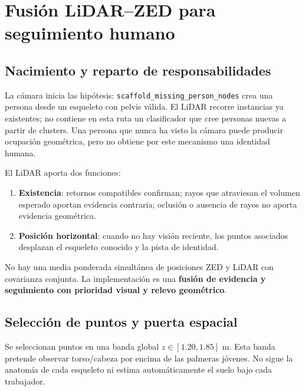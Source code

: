 \documentclass[11pt,a4paper]{article}
\newcommand{\code}[1]{\nolinkurl{#1}}
\begin{document}
\section{Fusión LiDAR--ZED para seguimiento humano}
\label{sec:humanfusion}

\subsection{Nacimiento y reparto de responsabilidades}
La cámara inicia las hipótesis: \code{scaffold_missing_person_nodes} crea una persona
desde un esqueleto con pelvis válida. El LiDAR recorre instancias ya existentes;
no contiene en esta ruta un clasificador que cree personas nuevas a partir de
clusters. Una persona que nunca ha visto la cámara puede producir ocupación
geométrica, pero no obtiene por este mecanismo una identidad humana.~\cite{humangraph,humanlidar}

El LiDAR aporta dos funciones:
\begin{enumerate}
\item \textbf{Existencia}: retornos compatibles confirman; rayos que atraviesan el
volumen esperado aportan evidencia contraria; oclusión o ausencia de rayos no aporta
evidencia geométrica.
\item \textbf{Posición horizontal}: cuando no hay visión reciente, los puntos
asociados desplazan el esqueleto conocido y la pista de identidad.
\end{enumerate}
No hay una media ponderada simultánea de posiciones ZED y LiDAR con covarianza
conjunta. La implementación es una \textbf{fusión de evidencia y seguimiento con
prioridad visual y relevo geométrico}.~\cite{humanlidar,humanworker}

\subsection{Selección de puntos y puerta espacial}
Se seleccionan puntos en una banda global $z\in[1.20,1.85]$ m. Esta banda pretende
observar torso/cabeza por encima de las palmeras jóvenes. No sigue la anatomía de
cada esqueleto ni estima automáticamente el suelo bajo cada trabajador.
\cite{humanlidar,humanconfig}
\end{document}

